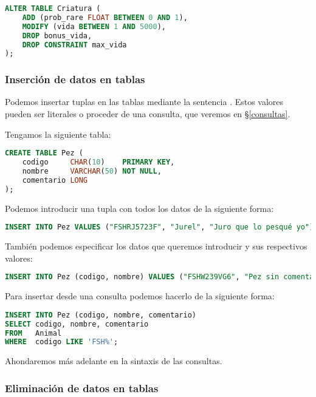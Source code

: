 \begin{lstlisting}[language=SQL]
ALTER TABLE Criatura (
	ADD (prob_rare FLOAT BETWEEN 0 AND 1),
	MODIFY (vida BETWEEN 1 AND 5000),
	DROP bonus_vida,
	DROP CONSTRAINT max_vida
);
\end{lstlisting}

\subsubsection{Inserción de datos en tablas}

Podemos insertar tuplas en las tablas mediante la sentencia .
Estos valores pueden ser literales o proceder de una consulta, que veremos en \S\ref{consultas}.

Tengamos la siguiente tabla:

\begin{lstlisting}[language=SQL]
CREATE TABLE Pez (
	codigo     CHAR(10)    PRIMARY KEY,
	nombre     VARCHAR(50) NOT NULL,
	comentario LONG
);
\end{lstlisting}

Podemos introducir una tupla con todos los datos de la siguiente forma:

\begin{lstlisting}[language=SQL]
INSERT INTO Pez VALUES ("FSHRJ5723F", "Jurel", "Juro que lo pesqué yo");
\end{lstlisting}

También podemos especificar los datos que queremos introducir y sus respectivos valores:

\begin{lstlisting}[language=SQL]
INSERT INTO Pez (codigo, nombre) VALUES ("FSHW239VG6", "Pez sin comentario");
\end{lstlisting}

Para insertar desde una consulta podemos hacerlo de la siguiente forma:

\begin{lstlisting}[language=SQL]
INSERT INTO Pez (codigo, nombre, comentario)
SELECT codigo, nombre, comentario
FROM   Animal
WHERE  codigo LIKE 'FSH%';
\end{lstlisting}

Ahondaremos más adelante en la sintaxis de las consultas.

\subsubsection{Eliminación de datos en tablas}

